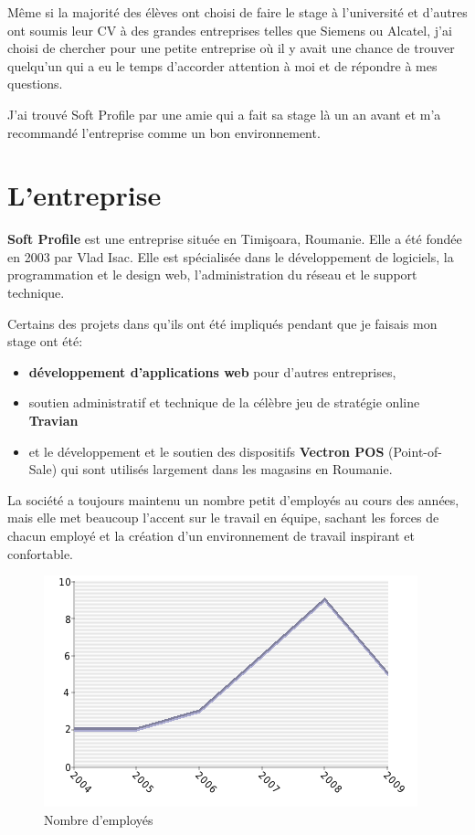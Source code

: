 \documentclass[a4paper,10pt]{report}
\begin{document}
Même si la majorité des élèves ont choisi de faire le stage à l'université et d'autres ont soumis leur
CV à des grandes entreprises telles que Siemens ou Alcatel, j'ai choisi de chercher
pour une petite entreprise où il y avait une chance de trouver quelqu'un qui a eu le temps d'accorder attention
\`a moi et de répondre à mes questions.

J'ai trouvé Soft Profile par une amie qui a fait sa stage l\`a un an avant et m'a recommandé
l'entreprise comme un bon environnement.

\section{L'entreprise}

\textbf{Soft Profile} est une entreprise située en Timi\c{s}oara, Roumanie. Elle a été fondée en 2003 par Vlad Isac.
Elle est spécialisée dans le développement de logiciels, la programmation et le design web, l'administration du réseau
et le support technique.

Certains des projets dans qu'ils ont été impliqués pendant que je faisais mon stage ont été:
\begin{itemize}
    \item \textbf{développement d'applications web} pour d'autres entreprises,
	\item soutien administratif et technique de la célèbre jeu de stratégie online
\textbf{Travian}
	\item et le développement et le soutien des dispositifs \textbf{Vectron POS} (Point-of-Sale) qui
sont utilisés largement dans les magasins en Roumanie.
\end{itemize}

La société a toujours maintenu un nombre petit d'employés au cours des années, mais elle met
beaucoup l'accent sur le travail en équipe, sachant les forces de chacun employé et la
création d'un environnement de travail inspirant et confortable.
\clearpage
\begin{figure}[h!]
	\centering
	\caption{Nombre d'employés}
	\includegraphics[scale=0.85]{img/soft-employees.png}
\end{figure}
\end{document}
